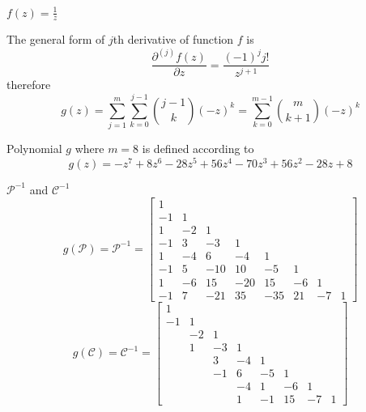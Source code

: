 \documentclass{beamer}
\begin{document}
\begin{frame}{$f(z)=\frac{1}{z}$}

The general form of $j$th derivative of function $f$ is 
$$\frac{\partial^{(j)}{f}(z)}{\partial{z}} = \frac{(-1)^{j}j!}{z^{j+1}}$$ 
therefore
\begin{displaymath}
  g(z) = \sum_{j=1}^{m}{\sum_{k=0}^{j-1}{{{j-1}\choose{k}}(-z)^{k}}} 
   = \sum_{k=0}^{m-1}{{{m}\choose{k+1}}(-z)^{k}}
\end{displaymath}

\vfill

Polynomial $g$ where $m=8$ is defined according to 
 \[g{\left (z \right )} = - z^{7} + 8 z^{6} - 28 z^{5} + 56 z^{4} - 70 z^{3} + 56 z^{2} - 28 z + 8\]
\end{frame}

\begin{frame}{$\mathcal{P}^{-1}$ and $\mathcal{C}^{-1}$}
{\footnotesize
\begin{displaymath}
g(\mathcal{P})=\mathcal{P}^{-1}= \left[\begin{matrix}1 &   &   &   &   &   &   &  \\-1 & 1 &   &   &   &   &   &  \\1 & -2 & 1 &   &   &   &   &  \\-1 & 3 & -3 & 1 &   &   &   &  \\1 & -4 & 6 & -4 & 1 &   &   &  \\-1 & 5 & -10 & 10 & -5 & 1 &   &  \\1 & -6 & 15 & -20 & 15 & -6 & 1 &  \\-1 & 7 & -21 & 35 & -35 & 21 & -7 & 1\end{matrix}\right]
\end{displaymath}
\begin{displaymath}
g(\mathcal{C})=\mathcal{C}^{-1}=\left[\begin{matrix}1 &   &   &   &   &   &   &  \\-1 & 1 &   &   &   &   &   &  \\  & -2 & 1 &   &   &   &   &  \\  & 1 & -3 & 1 &   &   &   &  \\  &   & 3 & -4 & 1 &   &   &  \\  &   & -1 & 6 & -5 & 1 &   &  \\  &   &   & -4 & 1  & -6 & 1 &  \\  &   &   & 1 & -1  & 15 & -7 & 1\end{matrix}\right]
\end{displaymath}
}
\end{frame}
\end{document}
